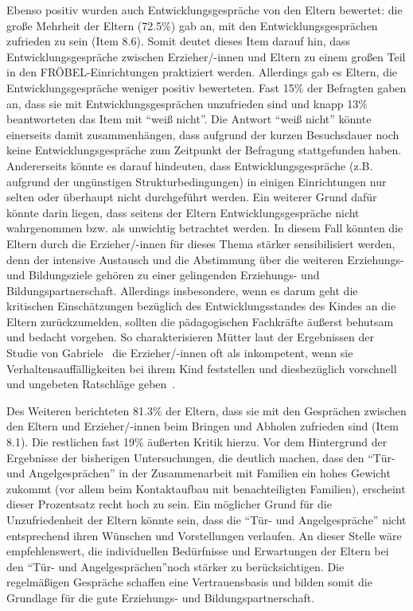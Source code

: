 \documentclass[12pt,a4paper]{article}
\begin{document}
	Ebenso positiv wurden auch Entwicklungsgespräche von den Eltern bewertet: die große Mehrheit der Eltern (72.5\%) gab an, mit den Entwicklungsgesprächen zufrieden zu sein (Item 8.6). Somit deutet dieses Item darauf hin, dass Entwicklungsgespräche zwischen Erzieher/-innen und Eltern zu einem großen Teil in den FRÖBEL-Einrichtungen praktiziert werden. Allerdings gab es Eltern, die Entwicklungsgespräche weniger positiv bewerteten. Fast 15\% der Befragten gaben an, dass sie mit Entwicklungsgesprächen unzufrieden sind und knapp 13\% beantworteten das Item mit "`weiß nicht"'. Die Antwort "`weiß nicht"' könnte einerseits damit zusammenhängen, dass aufgrund der kurzen Besuchsdauer noch keine Entwicklungsgespräche zum Zeitpunkt der Befragung stattgefunden haben. Andererseits könnte es darauf hindeuten, dass Entwicklungsgespräche (z.B. aufgrund der ungünstigen Strukturbedingungen) in einigen Einrichtungen nur selten oder überhaupt nicht durchgeführt werden. Ein weiterer Grund dafür könnte darin liegen, dass seitens der Eltern Entwicklungsgespräche nicht wahrgenommen bzw. als unwichtig betrachtet werden. In diesem Fall könnten die Eltern durch die Erzieher/-innen für dieses Thema stärker sensibilisiert werden, denn der intensive Austausch und die Abstimmung über die weiteren Erziehungs- und Bildungsziele gehören zu einer gelingenden Erziehungs- und Bildungspartnerschaft. Allerdings insbesondere, wenn es darum geht die kritischen Einschätzungen bezüglich des Entwicklungsstandes des Kindes an die Eltern zurückzumelden, sollten die pädagogischen Fachkräfte äußerst behutsam und bedacht vorgehen. So charakterisieren Mütter laut der Ergebnissen der Studie von Gabriele~\textcite{Peitz} die Erzieher/-innen oft als inkompetent, wenn sie Verhaltensauffälligkeiten bei ihrem Kind feststellen und diesbezüglich vorschnell und ungebeten Ratschläge geben~\parencite[S.~265-270]{Peitz}.
	
	Des Weiteren berichteten 81.3\% der Eltern, dass sie mit den Gesprächen zwischen den Eltern und Erzieher/-innen beim Bringen und Abholen zufrieden sind (Item 8.1). Die restlichen fast 19\% äußerten Kritik hierzu. Vor dem Hintergrund der Ergebnisse der bisherigen Untersuchungen, die deutlich machen, dass den "`Tür- und Angelgesprächen"' in der Zusammenarbeit mit Familien ein hohes Gewicht zukommt (vor allem beim Kontaktaufbau mit benachteiligten Familien), erscheint dieser Prozentsatz recht hoch zu sein. Ein möglicher Grund für die Unzufriedenheit der Eltern könnte sein, dass die "`Tür- und Angelgespräche"' nicht entsprechend ihren Wünschen und Vorstellungen verlaufen. An dieser Stelle wäre empfehlenswert, die individuellen Bedürfnisse und Erwartungen der Eltern bei den "`Tür- und Angelgesprächen"'noch stärker zu berücksichtigen. Die regelmäßigen Gespräche schaffen eine Vertrauensbasis und bilden somit die Grundlage für die gute Erziehungs- und Bildungspartnerschaft.
	
\end{document}
